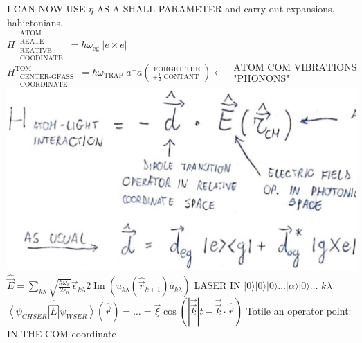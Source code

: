 \documentclass[10pt]{article}
\begin{document}
I CAN NOW USE $\eta$ AS A SHALL PARAMETER and carry out expansions. hahictonians.\\
$H_{\substack{\text { REATIVE } \\ \text { COODINATE }}}^{\substack{\text { ATOM } \\ \text { REATE }}}=\hbar \omega_{\text {eg }}|e \times e|$\\
$H_{\substack{\text { CENTER-GFASS } \\ \text { COORDINATE }}}^{\text {TOM }}=\hbar \omega_{\text {TRAP }} a^{+} a\binom{\text { FORGET THE }}{+\frac{1}{2} \text { CONTANT }} \leftarrow \begin{gathered}\text { ATOM COM VIBRATIONS } \\ \text { "PHONONS" }\end{gathered}$\\
\includegraphics[max width=\textwidth, center]{2025_10_16_9146de9f5ba4f09535e7g-3(1)}\\
$\hat{\vec{E}}=\sum_{k \lambda} \sqrt{\frac{\hbar \omega_{k}}{2 \varepsilon_{0}}} \vec{\epsilon}_{k \lambda} 2 \operatorname{Im}\left(u_{k \lambda}\left(\hat{\vec{r}}_{k+1}\right) \hat{a}_{k \lambda}\right)$ LASER IN $|0\rangle|0\rangle|0\rangle \ldots|\alpha\rangle|0\rangle \ldots$ $k \lambda$\\
$\left\langle\psi_{C H S E R}\right| \hat{\vec{E}}\left|\psi_{W S E R}\right\rangle(\hat{\vec{r}})=\ldots=\vec{\xi} \cos (|\overrightarrow{\vec{k}}| t-\overrightarrow{\vec{k}} \cdot \hat{\vec{r}})$ Totile an operator polnt: IN THE COM coordinate
\end{document}
